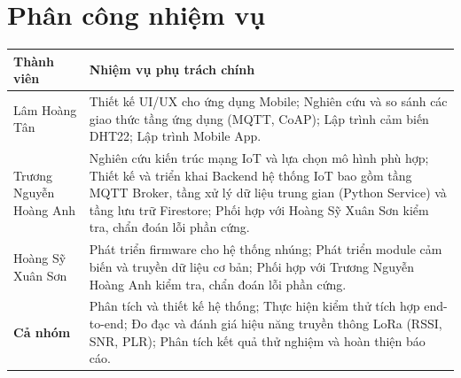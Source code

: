 \chapter*{Phân công nhiệm vụ}
\begin{table}[H]
\centering
\renewcommand{\arraystretch}{1.3} %
\begin{tabularx}{\textwidth}{@{} p{4.5cm} X @{}} %
\toprule
\textbf{Thành viên} & \textbf{Nhiệm vụ phụ trách chính} \\ 
\midrule

Lâm Hoàng Tân 
& Thiết kế UI/UX cho ứng dụng Mobile; Nghiên cứu và so sánh các giao thức tầng ứng dụng (MQTT, CoAP); Lập trình cảm biến DHT22; Lập trình Mobile App. \\ 
\addlinespace %

Trương Nguyễn Hoàng Anh 
& Nghiên cứu kiến trúc mạng IoT và lựa chọn mô hình phù hợp; Thiết kế và triển khai Backend hệ thống IoT bao gồm tầng MQTT Broker, tầng xử lý dữ liệu trung gian (Python Service) và tầng lưu trữ Firestore; Phối hợp với Hoàng Sỹ Xuân Sơn kiểm tra, chẩn đoán lỗi phần cứng. \\ 
\addlinespace

Hoàng Sỹ Xuân Sơn 
& Phát triển firmware cho hệ thống nhúng; Phát triển module cảm biến và truyền dữ liệu cơ bản; Phối hợp với Trương Nguyễn Hoàng Anh kiểm tra, chẩn đoán lỗi phần cứng. \\ 
\addlinespace

\textbf{Cả nhóm}
& Phân tích và thiết kế hệ thống; Thực hiện kiểm thử tích hợp end-to-end; Đo đạc và đánh giá hiệu năng truyền thông LoRa (RSSI, SNR, PLR); Phân tích kết quả thử nghiệm và hoàn thiện báo cáo. \\ 
\bottomrule

\end{tabularx}
\end{table}